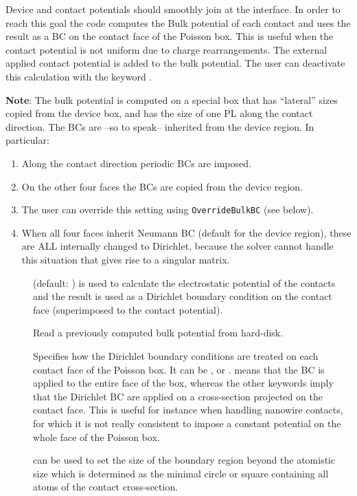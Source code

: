 Device and contact potentials should smoothly join at the interface. In order to
reach this goal the code computes the Bulk potential of each contact and uses
the result as a BC on the contact face of the Poisson box. This is useful when
the contact potential is not uniform due to charge rearrangements. The external
applied contact potential is added to the bulk potential.  The user can
deactivate this calculation with the keyword .

{\bf Note}: The bulk potential is computed on a special box that has ``lateral''
sizes copied from the device box, and has the size of one PL along the contact
direction. The BCs are --so to speak-- inherited from the device region. In
particular:
\begin{enumerate}
\item Along the contact direction periodic BCs are imposed.
\item On the other four faces the BCs are copied from the device region.
\item The user can override this setting using \verb|OverrideBulkBC| (see
  below).
\item When all four faces inherit Neumann BC (default for the device region),
  these are ALL internally changed to Dirichlet, because the solver cannot
  handle this situation that gives rise to a singular matrix.
\end{enumerate}

\begin{description}
\item[] (default: ) is used to calculate the
  electrostatic potential of the contacts and the result is used as a Dirichlet
  boundary condition on the contact face (superimposed to the contact
  potential).
\item[] Read a previously computed bulk potential from
  hard-disk.
\item[] Specifies how the Dirichlet boundary conditions are
  treated on each contact face of the Poisson box. It can be ,
   or .  means that the BC is applied to the
  entire face of the box, whereas the other keywords imply that the Dirichlet
  BC are applied on a cross-section projected on the contact face. This is
  useful for instance when handling nanowire contacts, for which it is not
  really consistent to impose a constant potential on the whole face of the
  Poisson box.
\item[] can be used to set the size of
  the boundary region beyond the atomistic size which is determined as the
  minimal circle or square containing all atoms of the contact cross-section.
\end{description}

